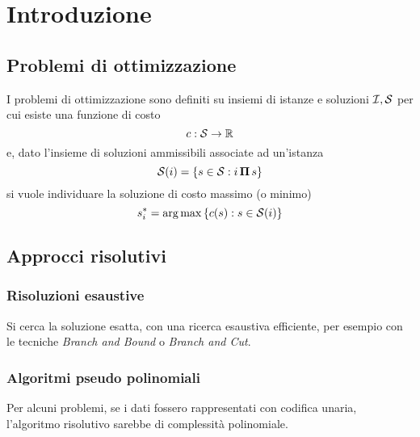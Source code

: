 
\section{Introduzione}

\subsection{Problemi di ottimizzazione}

I problemi di ottimizzazione sono definiti su insiemi di istanze e soluzioni $
\mathcal{I}, \mathcal{S}
$ per cui esiste una funzione di costo
\begin{equation*}
    c : \mathcal{S}{} \to \mathbb{R}
\end{equation*}
e, dato l'insieme di soluzioni ammissibili associate ad un'istanza
\begin{equation*}
    \mathcal{S}{} (i) = \left\{ s \in \mathcal{S}{} : i \, \bm{\Pi}{} \, s \right\}
\end{equation*}
si vuole individuare la soluzione di costo massimo (o minimo)
\begin{equation*}
    s_{i}^{*} = \operatorname*{arg\,max} \left\{ c(s) : s \in \mathcal{S}{} (i) \right\}
\end{equation*}

\subsection{Approcci risolutivi}

\subsubsection{Risoluzioni esaustive}

Si cerca la soluzione esatta, con una ricerca esaustiva efficiente, per esempio con le tecniche \emph{Branch and Bound} o \emph{Branch and Cut}.

\subsubsection{Algoritmi pseudo polinomiali}

Per alcuni problemi, se i dati fossero rappresentati con codifica unaria, l'algoritmo risolutivo sarebbe di complessità polinomiale.

